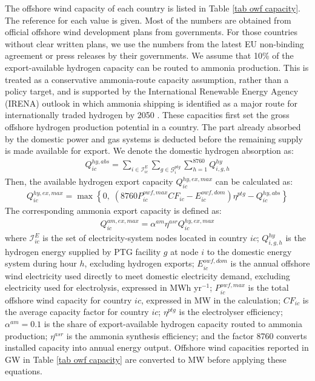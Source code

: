 \documentclass[sn-mathphys,Numbered]{sn-jnl}%
\theoremstyle{plain}%
\theoremstyle{definition}%
\theoremstyle{remark}%
\begin{document}
The offshore wind capacity of each country is listed in Table \ref{tab owf capacity}. The reference for each value is given. Most of the numbers are obtained from official offshore wind development plans from governments. For those countries without clear written plans, we use the numbers from the latest EU non-binding agreement or press releases by their governments. We assume that 10\% of the export-available hydrogen capacity can be routed to ammonia production. This is treated as a conservative ammonia-route capacity assumption, rather than a policy target, and is supported by the International Renewable Energy Agency (IRENA) outlook in which ammonia shipping is identified as a major route for internationally traded hydrogen by 2050 \cite{IRENAGlobalHydrogenTradeOutlook2022}. These capacities first set the gross offshore hydrogen production potential in a country. The part already absorbed by the domestic power and gas systems is deducted before the remaining supply is made available for export. We denote the domestic hydrogen absorption as:
\begin{align}
    Q_{ic}^{hy,abs} = \sum_{i \in \mathcal{I}_{ic}^E} \sum_{g \in \mathcal{G}_i^{ptg}} \sum_{h=1}^{8760} Q_{i,g,h}^{hy}
\end{align}
Then, the available hydrogen export capacity $Q_{ic}^{hy,ex,max}$ can be calculated as:
\begin{align}
    Q_{ic}^{hy,ex,max} = \max \left\{0,\; \left(8760 P_{ic}^{owf,max} CF_{ic} - E_{ic}^{owf,dom}\right) \eta^{ptg} - Q_{ic}^{hy,abs} \right\}
\end{align}
The corresponding ammonia export capacity is defined as:
\begin{align}
    Q_{ic}^{am,ex,max} = \alpha^{am} \eta^{asr} Q_{ic}^{hy,ex,max}
\end{align}
where $\mathcal{I}_{ic}^E$ is the set of electricity-system nodes located in country $ic$; $Q_{i,g,h}^{hy}$ is the hydrogen energy supplied by PTG facility $g$ at node $i$ to the domestic energy system during hour $h$, excluding hydrogen exports; $E_{ic}^{owf,dom}$ is the annual offshore wind electricity used directly to meet domestic electricity demand, excluding electricity used for electrolysis, expressed in MWh yr$^{-1}$; $P_{ic}^{owf,max}$ is the total offshore wind capacity for country $ic$, expressed in MW in the calculation; $CF_{ic}$ is the average capacity factor for country $ic$; $\eta^{ptg}$ is the electrolyser efficiency; $\alpha^{am}=0.1$ is the share of export-available hydrogen capacity routed to ammonia production; $\eta^{asr}$ is the ammonia synthesis efficiency; and the factor 8760 converts installed capacity into annual energy output. Offshore wind capacities reported in GW in Table \ref{tab owf capacity} are converted to MW before applying these equations.
\end{document}
